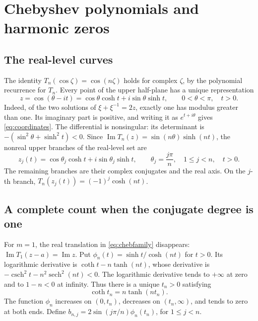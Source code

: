 \documentclass[a4paper]{amsart}
\theoremstyle{remark}
\DeclareMathOperator{\Ima}{Im}
\DeclareMathOperator{\sech}{sech}
\DeclareMathOperator{\csch}{csch}
\begin{document}
\section{Chebyshev polynomials and harmonic zeros}\label{sec:cheb}

\subsection{The real-level curves}
The identity \(T_n(\cos\zeta)=\cos(n\zeta)\) holds for complex
\(\zeta\), by the polynomial recurrence for \(T_n\).
Every point of the upper half-plane has a unique representation
\begin{equation}\label{eq:coordinates}
 z=\cos(\theta-it)=\cos\theta\cosh t+i\sin\theta\sinh t,
 \qquad 0<\theta<\pi,\quad t>0.
\end{equation}
Indeed, of the two solutions of \(\xi+\xi^{-1}=2z\), exactly one
has modulus greater than one. Its imaginary part is positive,
and writing it as \(e^{t+i\theta}\) gives \eqref{eq:coordinates}.
The differential is nonsingular: its determinant is
\(-(\sin^2\theta+\sinh^2t)<0\).
Since \(\Ima T_n(z)=\sin(n\theta)\sinh(nt)\), the nonreal upper
branches of the real-level set are
\begin{equation}\label{eq:branches}
 z_j(t)=\cos\theta_j\cosh t+i\sin\theta_j\sinh t,\qquad
 \theta_j=\frac{j\pi}{n},\quad 1\le j<n,\quad t>0.
\end{equation}
The remaining branches are their complex conjugates and the real
axis. On the \(j\)-th branch, \(T_n(z_j(t))=(-1)^j\cosh(nt)\).

\subsection{A complete count when the conjugate degree is one}
For \(m=1\), the real translation in \eqref{eq:chebfamily} disappears:
\(\Ima T_1(z-a)=\Ima z\). Put
\(\phi_n(t)=\sinh t/\cosh(nt)\) for \(t>0\).
Its logarithmic derivative is
\(\coth t-n\tanh(nt)\), whose derivative is
\(-\csch^2t-n^2\sech^2(nt)<0\).
The logarithmic derivative tends to \(+\infty\) at zero and to
\(1-n<0\) at infinity. Thus there is a unique \(t_n>0\) satisfying
\begin{equation}\label{eq:tn}
 \coth t_n=n\tanh(nt_n).
\end{equation}
The function \(\phi_n\) increases on \((0,t_n)\), decreases on
\((t_n,\infty)\), and tends to zero at both ends.
Define \(b_{n,j}=2\sin(j\pi/n)\phi_n(t_n)\), for \(1\le j<n\).
\end{document}
